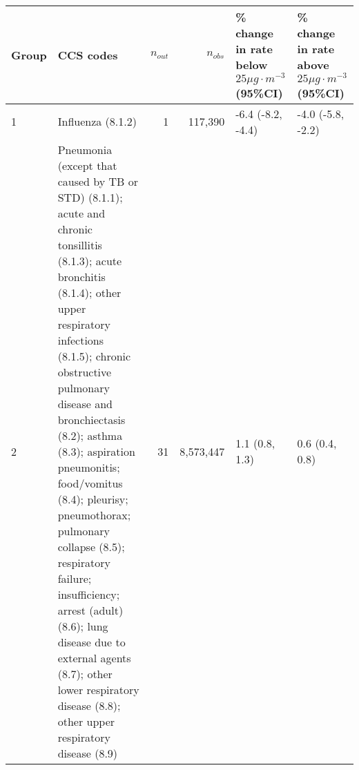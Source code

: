 \begin{tabular}{lp{6.5cm}rrp{2.2cm}p{2.2cm}}
  \hline
Group & CCS codes & $n_{out}$ & $n_{obs}$ & \% change in rate below $25 \mu g \cdot m^{-3}$ (95\%CI) & \% change in rate above $25 \mu g \cdot m^{-3}$ (95\%CI) \\ 
  \hline
 1 & Influenza (8.1.2) &  1 & 117,390 & -6.4 (-8.2, -4.4) & -4.0 (-5.8, -2.2) \\ 
   2 & Pneumonia (except that caused by TB or STD) (8.1.1); acute and chronic tonsillitis (8.1.3); acute bronchitis (8.1.4); other upper respiratory infections (8.1.5); chronic obstructive pulmonary disease and bronchiectasis (8.2); asthma (8.3); aspiration pneumonitis; food/vomitus (8.4); pleurisy; pneumothorax; pulmonary collapse (8.5); respiratory failure; insufficiency; arrest (adult) (8.6); lung disease due to external agents (8.7); other lower respiratory disease (8.8); other upper respiratory disease (8.9) & 31 & 8,573,447 & 1.1 (0.8, 1.3) & 0.6 (0.4, 0.8) \\ 
   \hline
\end{tabular}

